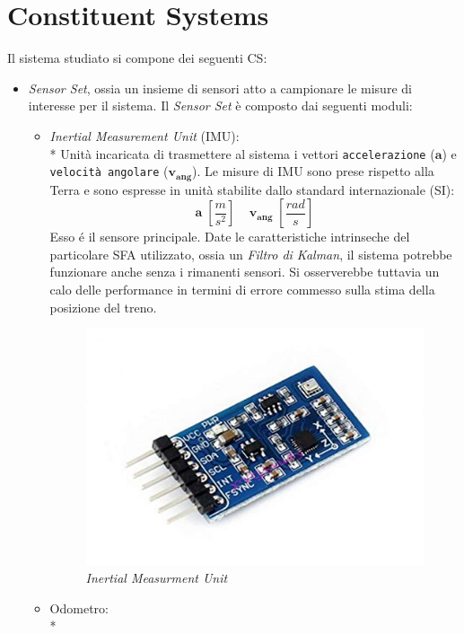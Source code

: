 \section{Constituent Systems}
Il sistema studiato si compone dei seguenti CS:
\begin{itemize}
	\item \emph{Sensor Set}, ossia un insieme di sensori atto a campionare le misure di interesse per il sistema. Il \emph{Sensor Set} \`e composto dai seguenti moduli:
	\begin{itemize}
		\item \emph{Inertial Measurement Unit} (IMU):\\*
		Unit\`a incaricata di trasmettere al sistema i vettori \texttt{accelerazione} ($\mathbf{a}$) e \texttt{velocit\`a angolare} ($\mathbf{v_{ang}}$). Le misure di IMU sono prese rispetto alla Terra e sono espresse in unit\`a stabilite dallo standard internazionale (SI):
		$$
		\mathbf{a}\;\left[\frac{m}{s^2}\right]\;\;\;\;\mathbf{v_{ang}}\;\left[ \frac{rad}{s} \right]
		$$
		Esso \'e il sensore principale. Date le caratteristiche intrinseche del particolare SFA utilizzato, ossia un \emph{Filtro di Kalman}, il sistema potrebbe funzionare anche senza i rimanenti sensori. Si osserverebbe tuttavia un calo delle performance in termini di errore commesso sulla stima della posizione del treno. \cite{partialmeas}
		\begin{figure}[h]
			\centering
			\includegraphics[width=\linewidth]{img/imu}
			\caption{\emph{Inertial Measurment Unit}}
			\label{fig:imu}
		\end{figure}
		\item Odometro:\\*

\end{itemize}
\end{itemize}
